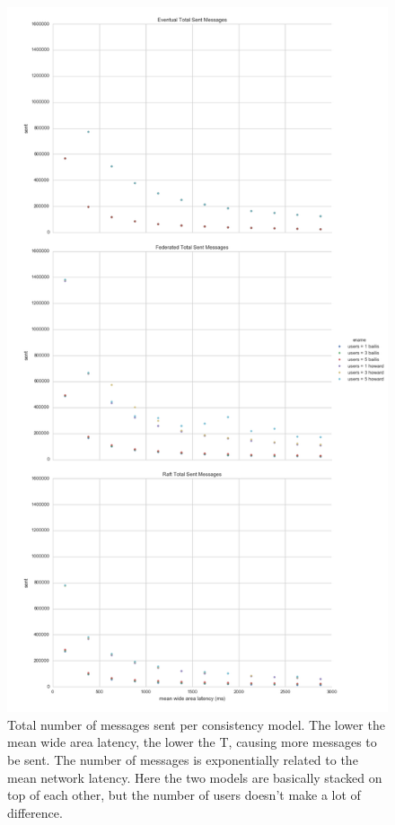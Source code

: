 \documentclass[10pt,letterpaper]{article}
\begin{document}
\begin{figure}[!h]
    \centering
        \includegraphics[height=0.9\textheight]{figures/messages_sent.png}
        \caption{\textsf{Total number of messages sent per consistency model. The lower the mean wide area latency, the lower the T, causing more messages to be sent. The number of messages is exponentially related to the mean network latency. Here the two models are basically stacked on top of each other, but the number of users doesn't make a lot of difference.}}
        \label{fig:messages_sent}
\end{figure}
\end{document}
